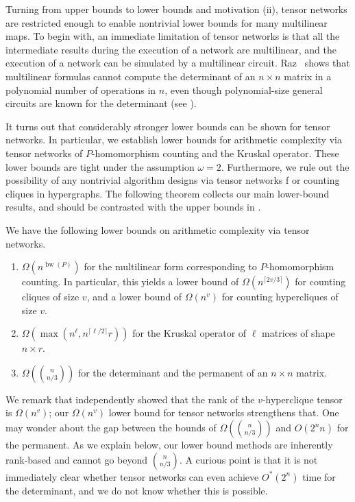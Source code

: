 \documentclass{toc}
\DeclareMathOperator{\bw}{bw}
\begin{document}
Turning from upper bounds to lower bounds and motivation (ii), tensor
networks are restricted enough to enable nontrivial lower bounds for many
multilinear maps.
To begin with, an immediate limitation of tensor networks is
that all the intermediate results during the execution of a network are
multilinear, and the execution of a network can be simulated by a multilinear
circuit. Raz~\cite{Raz2013} shows that multilinear formulas cannot compute
the
determinant of an $n\times n$ matrix in a polynomial number of operations
in $n$, even though polynomial-size general circuits are known for
the determinant 
%
%
%
(see \cite{Berkowitz1984,BunchH1974,Csanky1976,Rote2001}). 
%

It turns out that considerably stronger lower bounds can be shown
for tensor networks. In particular, we establish
%
%
%
%
lower bounds for arithmetic complexity via tensor
networks of $P$-homomorphism counting and the Kruskal operator.
%
%
%
%
These lower bounds are tight 
%
under the assumption $\omega=2$. %
%
Furthermore, we rule out the possibility of any
nontrivial algorithm designs via tensor networks f
or counting cliques in hypergraphs.
The following theorem collects our main lower-bound results, 
and should be contrasted with the upper bounds
in .

\begin{theorem}
  \label{thm:lower bounds}
  We have the following lower bounds on arithmetic complexity via tensor networks.  %
  \begin{enumerate}
  \item $\Omega(n^{\bw(P)})$ for the multilinear form corresponding to $P$-homomorphism counting.  In particular, this yields a lower bound of $\Omega(n^{\lceil 2v/3 \rceil})$ for counting cliques of size $v$, and a lower bound of $\Omega(n^v)$ for counting hypercliques of size $v$.
  \item $\Omega(\max(n^\ell, n^{\lceil \ell/2\rceil}r))$ for the Kruskal operator of $\ell$ matrices of shape $n\times r$.
  \item $\Omega(\binom{n}{n/3})$ for the determinant 
%
and the %
permanent of an $n \times n$ matrix.
  \end{enumerate}
\end{theorem}

We remark that \cite{LincolnWW18} independently showed that the rank of the $v$-hyperclique tensor is $\Omega(n^v)$; our $\Omega(n^v)$ lower bound for tensor networks strengthens that.
One may wonder about the gap between the bounds of
$\Omega(\binom{n}{n/3})$ and $O(2^n n)$ for the permanent.
As we explain below, our lower bound methods are inherently rank-based
and cannot go beyond $\binom{n}{n/3}$.  A curious point is that it is 
not immediately clear whether tensor networks can even achieve 
$O^*(2^n)$ time for the determinant, and we do not know whether
%
this is possible.
\end{document}
